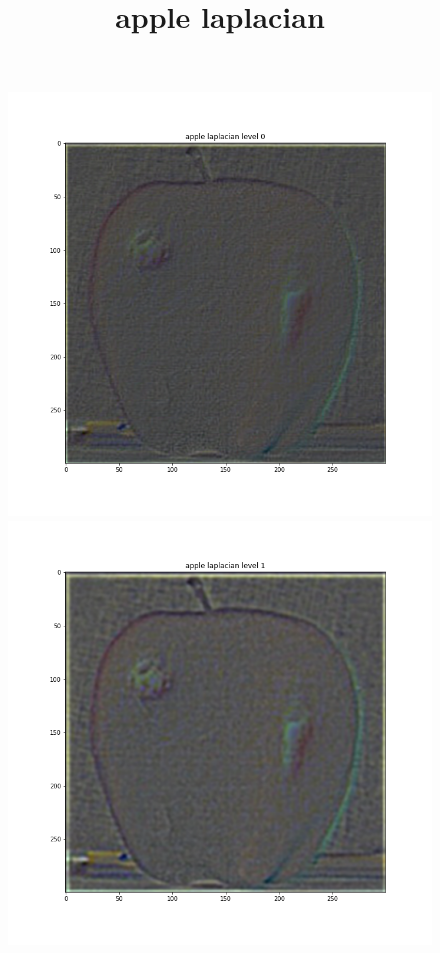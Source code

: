 \documentclass{article}
\begin{document}
\begin{figure}[!htb]
\title{apple laplacian}
    \includegraphics[width=\linewidth]{apple laplacian level 0.png}
\endminipage
{}
    \includegraphics[width=\linewidth]{apple laplacian level 1.png}

\end{figure}
\end{document}

